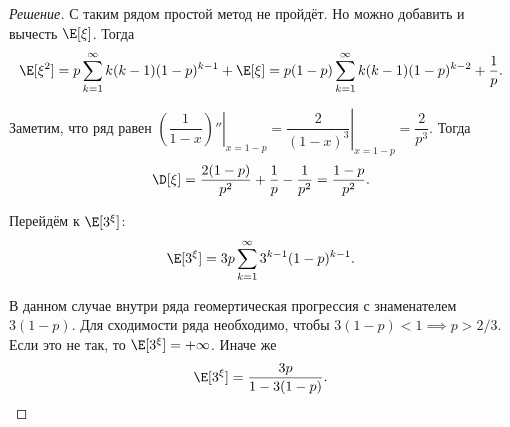 \begin{proof}[Решение]
    С таким рядом простой метод не пройдёт. Но можно добавить и вычесть \(\E[\xi]\). Тогда
    \[\E[\xi^2] = p\sum_{k = 1}^{\infty} k(k - 1)(1 - p)^{k - 1} +\E[\xi] = p(1 - p)\sum_{k = 1}^{\infty} k(k - 1)(1 - p)^{k - 2} + \frac{1}{p}.\]
    
    Заметим, что ряд равен \(\left.\left(\dfrac{1}{1 - x}\right)''\right|_{x = 1 - p} = \left.\dfrac{2}{(1 - x)^3}\right|_{x = 1 - p} = \dfrac{2}{p^3}\). Тогда \[\D[\xi] = \dfrac{2(1 - p)}{p^2} + \frac{1}{p} - \frac{1}{p^2} = \frac{1 - p}{p^2}.\]
    
    Перейдём к \(\E[3^{\xi}]\):
    \[\E[3^{\xi}] = 3p\sum_{k = 1}^{\infty} 3^{k - 1}(1 - p)^{k - 1}.\]
    
    В данном случае внутри ряда геомертическая прогрессия с знаменателем \(3(1 - p)\). Для сходимости ряда необходимо, чтобы \(3(1 - p) < 1 \implies p > 2/3\). Если это не так, то \(\E[3^{\xi}] = +\infty\). Иначе же \[\E[3^{\xi}] = \frac{3p}{1 - 3(1 - p)}.\qedhere\]
\end{proof}

